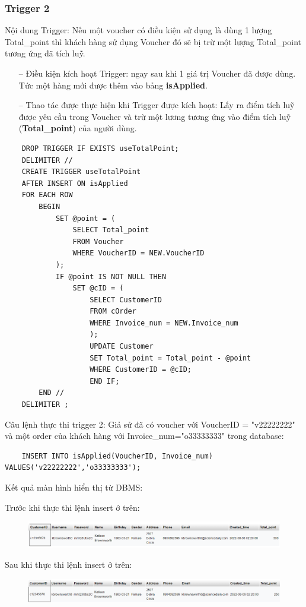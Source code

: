     \subsubsection{Trigger 2}
Nội dung Trigger: Nếu một voucher có điều kiện sử dụng là dùng 1 lượng Total\_point thì khách hàng sử dụng Voucher đó sẽ bị trừ một lượng Total\_point tương ứng đã tích luỹ.
\begin{itemize}
    \item[--] Điều kiện kích hoạt Trigger: ngay sau khi 1 giá trị Voucher đã được dùng. Tức một hàng mới được thêm vào bảng \textbf{isApplied}.
    \item[--] Thao tác được thực hiện khi Trigger được kích hoạt: Lấy ra điểm tích luỹ được yêu cầu trong Voucher và trừ một lương tương ứng vào điểm tích luỹ (\textbf{Total\_point}) của người dùng.
\end{itemize}

\begin{verbatim}
    DROP TRIGGER IF EXISTS useTotalPoint;
    DELIMITER //
    CREATE TRIGGER useTotalPoint
    AFTER INSERT ON isApplied
    FOR EACH ROW
        BEGIN
            SET @point = (
                SELECT Total_point 
                FROM Voucher
                WHERE VoucherID = NEW.VoucherID
            );
            IF @point IS NOT NULL THEN
                SET @cID = (
                    SELECT CustomerID
                    FROM cOrder
                    WHERE Invoice_num = NEW.Invoice_num
                    );
                    UPDATE Customer
                    SET Total_point = Total_point - @point
                    WHERE CustomerID = @cID;
                    END IF;
        END //
    DELIMITER ;
\end{verbatim}   

Câu lệnh thực thi trigger 2:
Giả sử đã có voucher với VoucherID = "v22222222" và một order của khách hàng với Invoice\_num="o33333333" trong database:
\begin{verbatim}
    INSERT INTO isApplied(VoucherID, Invoice_num) VALUES('v22222222','o33333333');
\end{verbatim}
Kết quả màn hình hiển thị từ DBMS:

Trước khi thực thi lệnh insert ở trên:
\begin{figure}[h]
    \centering
    \includegraphics[scale=0.5]{images/useTotalPoint1.png}
\end{figure}
\newpage
Sau khi thực thi lệnh insert ở trên:
\begin{figure}[h]
    \centering
    \includegraphics[scale=0.5]{images/useTotalPoint2.png}
\end{figure}

